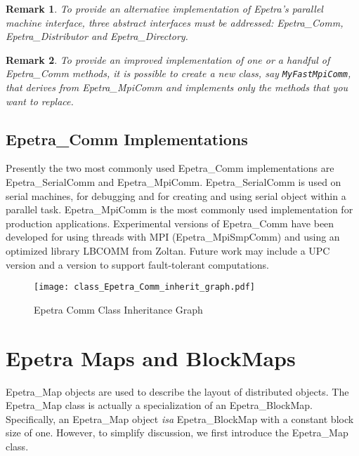 \documentclass[12pt,relax]{EpetraUserGuide}
\newcommand{\comm}{Epetra\_Comm}
\newcommand{\serialcomm}{Epetra\_SerialComm}
\newcommand{\mpicomm}{Epetra\_MpiComm}
\newcommand{\mpismpcomm}{Epetra\_MpiSmpComm}
\newcommand{\map}{Epetra\_Map}
\newcommand{\blockmap}{Epetra\_BlockMap}
\newcommand{\distributor}{Epetra\_Distributor}
\newcommand{\directory}{Epetra\_Directory}
\newtheorem{remark}{Remark}
\begin{document}
\begin{remark}
To provide an alternative implementation of Epetra's parallel machine interface,
three abstract interfaces must be addressed: \comm{}, \distributor{} and \directory.
\end{remark}

\begin{remark}
To provide an improved implementation of one or a handful of \comm{} methods,
it is possible to create a new class, say \verb!MyFastMpiComm!, that derives
from \mpicomm{} and implements only the methods that you want to replace.
\end{remark}

\subsection{\comm{} Implementations}

Presently the two most commonly used \comm{} implementations are
\serialcomm{} and \mpicomm{}.  \serialcomm{} is used on serial
machines, for debugging and for creating and using serial object
within a parallel task.  \mpicomm{} is the most commonly used
implementation for production applications.  Experimental versions
of \comm{} have been developed for using threads with MPI
(\mpismpcomm) and using an optimized library LBCOMM from Zoltan.
Future work may include a UPC~\cite{UPC} version and a version to
support fault-tolerant computations.
\begin{figure}
  \texttt{[image: class\_Epetra\_Comm\_inherit\_graph.pdf]}\\
  \caption{Epetra Comm Class Inheritance Graph}\label{class_Epetra_Comm_inherit_graph}
\end{figure}

\section{Epetra Maps and BlockMaps}
\label{Section:maps}

\map{} objects are used to describe the layout of distributed
objects.  The \map{} class is actually a specialization of an
\blockmap{}.  Specifically, an \map{} object {\it isa} \blockmap{}
with a constant block size of one.  However, to simplify discussion,
we first introduce the \map{} class.
\end{document}
